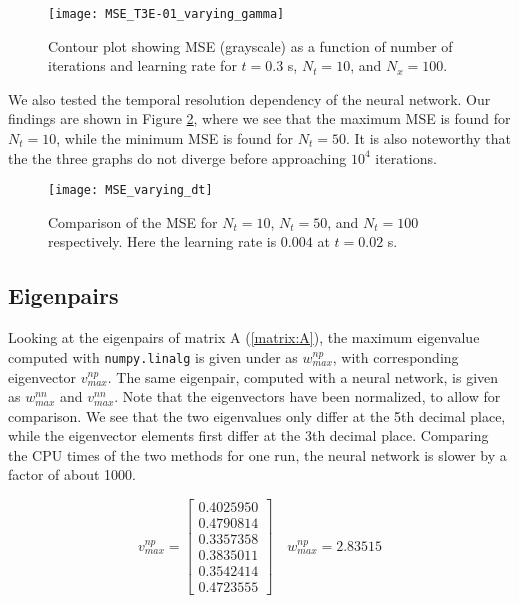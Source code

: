 \begin{figure}[htbp]
 	\centering
 	\texttt{[image: MSE\_T3E-01\_varying\_gamma]}
 	\caption{Contour plot showing MSE (grayscale) as a function of number of iterations and learning rate for $t=0.3$ s, $N_t = 10$, and $N_x = 100$.}
  \label{fig:MSE_T3E-01_varying_gamma}
\end{figure}

We also tested the temporal resolution dependency of the neural network. Our findings are shown in Figure \ref{fig:MSE_varying_dt}, where we see that the maximum MSE is found for $N_t = 10$, while the minimum MSE is found for $N_t = 50$. It is also noteworthy that the the three graphs do not diverge before approaching $10^4$ iterations.
\begin{figure}[htbp]
 	\centering
 	\texttt{[image: MSE\_varying\_dt]}
 	\caption{Comparison of the MSE for $N_t = 10$, $N_t = 50$, and $N_t = 100$ respectively. Here the learning rate is $0.004$ at $t=0.02$ s.}
  \label{fig:MSE_varying_dt}
\end{figure}


\subsection{Eigenpairs}
Looking at the eigenpairs of matrix A (\ref{matrix:A}), the maximum eigenvalue computed with  \texttt{numpy.linalg} is given under as $w_{max}^{np}$, with corresponding eigenvector $v_{max}^{np}$. The same eigenpair, computed with a neural network, is given as $w_{max}^{nn}$ and $v_{max}^{nn}$. Note that the eigenvectors have been normalized, to allow for comparison. We see that the two eigenvalues only differ at the 5th decimal place, while the eigenvector elements first differ at the 3th decimal place. Comparing the CPU times of the two methods for one run, the neural network is slower by a factor of about 1000.

\begin{equation*}
v_{max}^{np} = \begin{bmatrix}
	0.4025950 \\
	0.4790814 \\
	0.3357358 \\
    0.3835011 \\
    0.3542414 \\
    0.4723555
\end{bmatrix} \quad w_{max}^{np} =  2.83515
\end{equation*}

